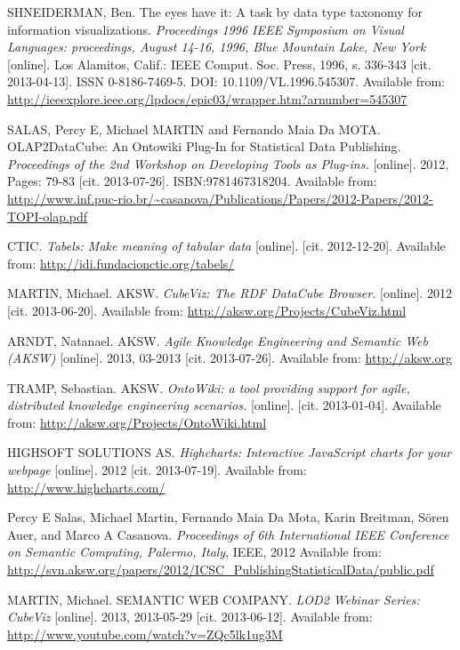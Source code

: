 \begin{thebibliography}{99}
 {\sc SHNEIDERMAN,} Ben.
 The eyes have it: A task by data type taxonomy for information visualizations.
 \emph{Proceedings 1996 IEEE Symposium on Visual Languages: proceedings,
 August 14-16, 1996, Blue Mountain Lake, New York}
 [online]. Los Alamitos, Calif.: IEEE Comput. Soc. Press, 1996, s. 336-343
 [cit. 2013-04-13]. ISSN 0-8186-7469-5. DOI: 10.1109/VL.1996.545307.
 Available from: \url{http://ieeexplore.ieee.org/lpdocs/epic03/wrapper.htm?arnumber=545307}

{\sc SALAS,} Percy E, Michael MARTIN and Fernando Maia Da MOTA.
OLAP2DataCube: An Ontowiki Plug-In for Statistical Data Publishing.
\emph{Proceedings of the 2nd Workshop on Developing Tools as Plug-ins.} 
[online]. 2012, Pages: 79-83 [cit. 2013-07-26]. ISBN:9781467318204.
Available from: \url{http://www.inf.puc-rio.br/~casanova/Publications/Papers/2012-Papers/2012-TOPI-olap.pdf}

{\sc CTIC.}
\emph{Tabels: Make meaning of tabular data} [online]. [cit. 2012-12-20].
Available from: \url{http://idi.fundacionctic.org/tabels/}

{\sc MARTIN,} Michael. AKSW.
\emph{CubeViz: The RDF DataCube Browser.} [online]. 2012 [cit. 2013-06-20].
Available from: \url{http://aksw.org/Projects/CubeViz.html}

{\sc ARNDT, Natanael.} AKSW. 
\emph{Agile Knowledge Engineering and Semantic Web (AKSW)} [online].
2013, 03-2013 [cit. 2013-07-26].
Available from: \url{http://aksw.org}

{\sc TRAMP,} Sebastian. AKSW.
\emph{OntoWiki: a tool providing support for agile, distributed knowledge engineering scenarios.}
[online]. [cit. 2013-01-04]. 
Available from: \url{http://aksw.org/Projects/OntoWiki.html}

{\sc HIGHSOFT SOLUTIONS AS.}
\emph{Highcharts: Interactive JavaScript charts for your webpage} [online]. 2012
[cit. 2013-07-19]. 
Available from: \url{http://www.highcharts.com/}

{\sc Percy} E Salas, Michael Martin, Fernando Maia Da Mota,
Karin Breitman, Sören Auer, and Marco A Casanova.
\emph{Proceedings of 6th International IEEE Conference on Semantic Computing, Palermo, Italy},
IEEE, 2012
Available from: \url{http://svn.aksw.org/papers/2012/ICSC_PublishingStatisticalData/public.pdf}

{\sc MARTIN,} Michael. SEMANTIC WEB COMPANY.
\emph{LOD2 Webinar Series: CubeViz} [online]. 2013, 2013-05-29
[cit. 2013-06-12].
Available from: \url{http://www.youtube.com/watch?v=ZQc5lk1ug3M}


\end{thebibliography}
